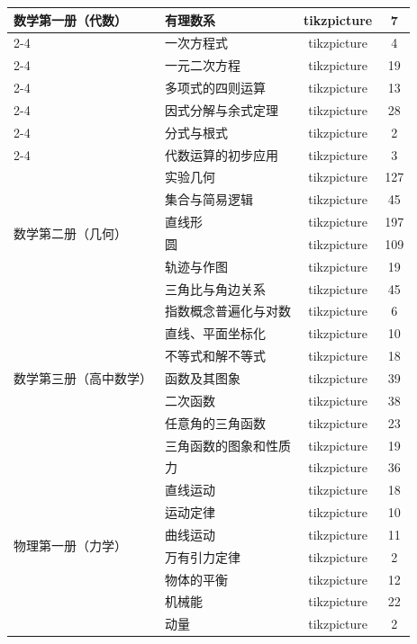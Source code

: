 \begin{center}
\begin{longtable}{|p{4.5cm}|p{5cm}|c|c|}
\multirow{7}{*}{数学第一册（代数）} & 有理数系 & tikzpicture & 7 \\
\cline{2-4}
 & 一次方程式 & tikzpicture & 4 \\
\cline{2-4}
 & 一元二次方程 & tikzpicture & 19 \\
\cline{2-4}
 & 多项式的四则运算 & tikzpicture & 13 \\
\cline{2-4}
 & 因式分解与余式定理 & tikzpicture & 28 \\
\cline{2-4}
 & 分式与根式 & tikzpicture & 2 \\
\cline{2-4}
 & 代数运算的初步应用 & tikzpicture & 3 \\
\hline
\multirow{6}{*}{数学第二册（几何）} & 实验几何 & tikzpicture & 127 \\
\cline{2-4}
 & 集合与简易逻辑 & tikzpicture & 45 \\
\cline{2-4}
 & 直线形 & tikzpicture & 197 \\
\cline{2-4}
 & 圆 & tikzpicture & 109 \\
\cline{2-4}
 & 轨迹与作图 & tikzpicture & 19 \\
\cline{2-4}
 & 三角比与角边关系 & tikzpicture & 45 \\
\hline
\multirow{7}{*}{数学第三册（高中数学）} & 指数概念普遍化与对数 & tikzpicture & 6 \\
\cline{2-4}
 & 直线、平面坐标化 & tikzpicture & 10 \\
\cline{2-4}
 & 不等式和解不等式 & tikzpicture & 18 \\
\cline{2-4}
 & 函数及其图象 & tikzpicture & 39 \\
\cline{2-4}
 & 二次函数 & tikzpicture & 38 \\
\cline{2-4}
 & 任意角的三角函数 & tikzpicture & 23 \\
\cline{2-4}
 & 三角函数的图象和性质 & tikzpicture & 19 \\
\hline
\multirow{11}{*}{物理第一册（力学）} & 力 & tikzpicture & 36 \\
\cline{2-4}
 & 直线运动 & tikzpicture & 18 \\
\cline{2-4}
 & 运动定律 & tikzpicture & 10 \\
\cline{2-4}
 & 曲线运动 & tikzpicture & 11 \\
\cline{2-4}
 & 万有引力定律 & tikzpicture & 2 \\
\cline{2-4}
 & 物体的平衡 & tikzpicture & 12 \\
\cline{2-4}
 & 机械能 & tikzpicture & 22 \\
\cline{2-4}
 & 动量 & tikzpicture & 2 \\

\end{longtable}
\end{center}
